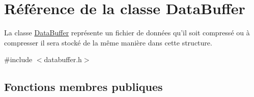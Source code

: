 \hypertarget{class_data_buffer}{\section{Référence de la classe Data\+Buffer}
\label{class_data_buffer}
}


La classe \hyperlink{class_data_buffer}{Data\+Buffer} représente un fichier de données qu'il soit compressé ou à compresser il sera stocké de la même manière dans cette structure.  




{\ttfamily \#include $<$databuffer.\+h$>$}

\subsection*{Fonctions membres publiques}
